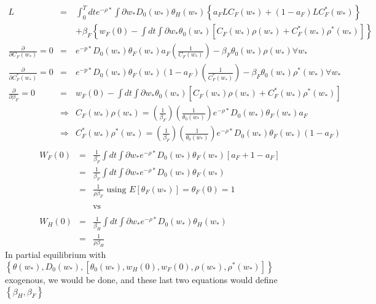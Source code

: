 \documentclass[]{article}
\begin{document}
\begin{eqnarray*}
L &=& \int_0^T dt e^{-\rho *} \int \partial w_* D_0(w_*) \theta _H (w_*) \left\{ a_F LC_F(w_*) + (1-a_F) L C_F^*(w_*)\right\}\\
&& + \beta _F \left\{ w_F(0) - \int dt \int \partial w_* \theta _0(w_*) \left[C_F(w_*) \rho(w_*) + C_F^*(w_*)\rho ^*(w_*)\right]\right\}\\
\frac{\partial}{\partial C_F(w_*)} = 0 &=& e^{-p*} D_0(w_*) \theta _F(w_*) a_F \left(\frac{1}{C_F(w_*)}\right) - \beta _F \theta _0(w_*) \rho (w_*) \forall w_*\\
\frac{\partial}{\partial C_F^*(w_*)} = 0 &=& e^{-p*} D_0(w_*) \theta _F(w_*) (1-a_F) \left(\frac{1}{C_F^*(w_*)}\right) - \beta _F \theta _0(w_*) \rho ^* (w_*) \forall w_*\\
\frac{\partial}{\partial \beta _F} = 0 &=& w_F(0) - \int dt \int \partial w_* \theta _0(w_*) \left[C_F(w_*) \rho (w_*) + C_F^* (w_*) \rho ^*(w_*)\right]\\
&\Rightarrow & C_F(w_*) \rho (w_*) = \left(\frac{1}{\beta _F}\right) \left(\frac{1}{\theta _0(w_*)}\right) e^{-\rho *} D_0(w_*) \theta _F(w_*) a_F\\
& \Rightarrow & C_F^*(w_*) \rho ^*(w_*) = \left(\frac{1}{\beta _F}\right) \left(\frac{1}{\theta _0(w_*)}\right) e^{-\rho *} D_0(w_*) \theta _F(w_*) (1-a_F)\\
\end{eqnarray*}
\begin{eqnarray*}
W_F(0) &=& \frac{1}{\beta _F} \int dt \int \partial w_* e^{-\rho *} D_0 (w_*) \theta _F(w_*) \left[a_F + 1-a_F\right]\\
&=& \frac{1}{\beta _F} \int dt \int \partial w_* e^{-\rho *} D_0 (w_*) \theta _F(w_*)\\
&=& \frac{1}{\rho \beta _F} \mbox{ using } E\left[ \theta _F (w_*)\right] = \theta _F(0) = 1\\
\\&& \mbox{vs}\\ \\
W_H(0) &=& \frac{1}{\beta _H} \int dt \int \partial w_* e^{-\rho *} D_0 (w_*) \theta _H(w_*)\\
&=& \frac{1}{\rho \beta _H}
\end{eqnarray*}
In partial equilibrium with $\left\{ \theta (w_*), D_0(w_*), \left[ \theta _0(w_*), w_H(0), w_F(0), \rho (w_*), \rho ^*(w_*) \right]\right\}$ exogenous, we would be done, and these last two equations would define $\left\{\beta_H, \beta_F\right\}$\\
\end{document}
